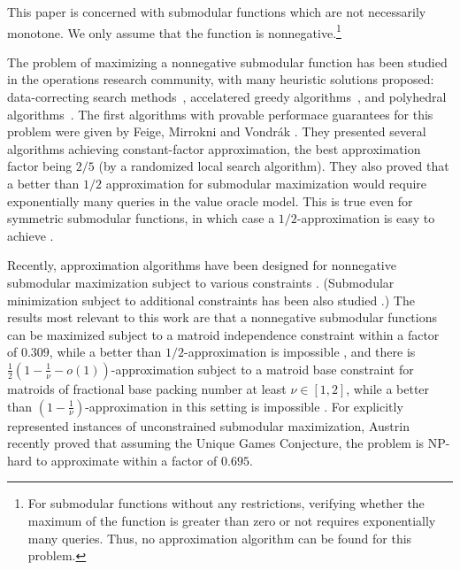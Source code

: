 \documentclass{article}[11pt]
\begin{document}
This paper is concerned with submodular functions which are not necessarily monotone.
We only assume that the function is nonnegative.\footnote{For submodular
functions without any restrictions, verifying whether the maximum
of the function is greater than zero or not requires exponentially many queries.
Thus, no approximation algorithm can be found for this problem.}
\iffalse 
In this setting, the maximization problem is computationally hard even without any constraint,
since it captures for example the Max Cut problem.
Typical examples of such a problem are Max Cut and Max Directed Cut.
Here, the best approximation factors have been achieved using
semidefinite programming: $0.878$ for Max Cut~\cite{GW95} and
$0.874$ for Max Di-Cut~\cite{FG95,LLZ02}. The approximation factor for
Max Cut has been proved optimal, assuming the Unique Games
Conjecture~\cite{KKMO04,MOO05}. An algorithm for Max Cut based on eigenvalue computations
rather than SDP is also known to beat the factor of $1/2$ \cite{Trevisan08}.
However, purely combinatorial algorithms for Max Cut and Max Di-Cut are known to
achieve only a $\frac12$-approximation \cite{HZ01}.
\fi
The problem of maximizing a nonnegative submodular function has been studied
in the operations research community, with many heuristic solutions proposed:
data-correcting search methods~\cite{GSTT99,GTT99,K89}, accelatered greedy algorithms~\cite{RS89},
and polyhedral algorithms~\cite{LNW96}.
The first algorithms with provable performace guarantees for this problem were given 
by Feige, Mirrokni and Vondr\'ak \cite{FMV07}. They presented several algorithms achieving
constant-factor approximation, the best approximation factor being $2/5$
 (by a randomized local search algorithm).
They also proved that a better than $1/2$ approximation for submodular maximization
would require exponentially many queries in the value oracle model.
This is true even for symmetric submodular functions, in which case a
$1/2$-approximation is easy to achieve \cite{FMV07}.

Recently, approximation algorithms have been designed for nonnegative
submodular maximization subject to various constraints \cite{LMNS09,LSV09,Vondrak09,GRST10}.
(Submodular minimization subject to additional constraints has been
also studied \cite{SF08,GKTW09,IN09}.)
The results most relevant to this work are that a nonnegative submodular functions can be
maximized subject to a matroid independence constraint within a factor of $0.309$,
while a better than $1/2$-approximation is impossible \cite{Vondrak09},
and there is $\frac12 (1-\frac{1}{\nu}-o(1))$-approximation subject to
a matroid base constraint for matroids of fractional
base packing number at least $\nu \in [1,2]$, while a better
than $(1-\frac{1}{\nu})$-approximation in this setting is impossible \cite{Vondrak09}.
For explicitly represented instances of unconstrained submodular maximization,
Austrin \cite{Austrin10} recently proved that assuming the Unique Games Conjecture,
the problem is NP-hard to approximate within a factor of $0.695$. 
\end{document}
